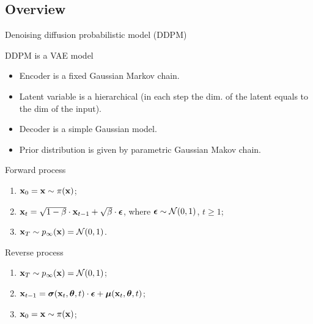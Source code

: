 \subsection{Overview}
\begin{frame}{Denoising diffusion probabilistic model (DDPM)}
	\begin{block}{DDPM is a VAE model}
		\begin{itemize}
			\item Encoder is a fixed Gaussian Markov chain.
			\item Latent variable is a hierarchical (in each step the dim. of the latent equals to the dim of the input).
			\item Decoder is a simple Gaussian model.
			\item Prior distribution is given by parametric Gaussian Makov chain.
		\end{itemize}
	\end{block}
	\begin{minipage}{0.5\linewidth}
		\begin{block}{Forward process}
			\begin{enumerate}
				\item $\mathbf{x}_0 = \mathbf{x} \sim \pi(\mathbf{x})$;
				\item $\mathbf{x}_t = \sqrt{1 - \beta} \cdot \mathbf{x}_{t - 1} + \sqrt{\beta} \cdot \boldsymbol{\epsilon}$, where $\boldsymbol{\epsilon} \sim \mathcal{N}(0, 1)$, $t \geq 1$;
				\item $\mathbf{x}_T \sim p_{\infty}(\mathbf{x}) = \mathcal{N}(0, 1)$.
			\end{enumerate}
		\end{block}
	\end{minipage}%
	\begin{minipage}{0.5\linewidth}
		\begin{block}{Reverse process}
			\begin{enumerate}
				\item $\mathbf{x}_T \sim p_{\infty}(\mathbf{x}) = \mathcal{N}(0, 1)$;
				\item $\mathbf{x}_{t - 1} = \boldsymbol{\sigma}(\mathbf{x}_t, \boldsymbol{\theta}, t) \cdot \boldsymbol{\epsilon} + \boldsymbol{\mu}(\mathbf{x}_t, \boldsymbol{\theta}, t)$;
				\item $\mathbf{x}_0 = \mathbf{x} \sim \pi(\mathbf{x})$;
			\end{enumerate}
		\end{block}
	\end{minipage}
\end{frame}
